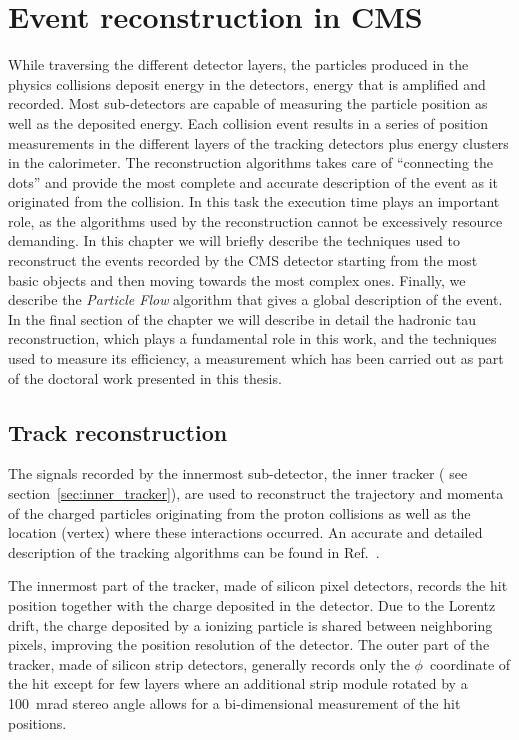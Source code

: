 \chapter{Event reconstruction in CMS}

While traversing the different detector layers, the particles produced in the physics collisions deposit energy in the detectors, energy that is amplified and recorded. Most sub-detectors are capable of measuring the particle position as well as the deposited energy. Each collision event results in a series of position measurements in the different layers of the tracking detectors plus energy clusters in the calorimeter. The reconstruction algorithms takes care of ``connecting the dots'' and provide the most complete and accurate description of the event as it originated from the collision. In this task the execution time plays an important role, as the algorithms used by the reconstruction cannot be excessively resource demanding. In this chapter we will briefly describe the techniques used to reconstruct the events recorded by the CMS detector starting from the most basic objects and then moving towards the most complex ones. Finally, we describe the \emph{Particle Flow} algorithm that gives a global description of the event. In the final section of the chapter we will describe in detail the hadronic tau reconstruction, which plays a fundamental role in this work, and the techniques used to measure its efficiency, a measurement which has been carried out as part of the doctoral work presented in this thesis.

\section{Track reconstruction}

The signals recorded by the innermost sub-detector, the inner tracker ( see section~\ref{sec:inner_tracker}), are used to reconstruct the trajectory and momenta of the charged particles originating from the proton collisions as well as the location (vertex) where these interactions occurred. An accurate and detailed description of the tracking algorithms can be found in Ref.~\cite{cms_trk_11_01}.

The innermost part of the tracker, made of silicon pixel detectors, records the hit position together with the charge deposited in the detector. Due to the Lorentz drift, the charge deposited by a ionizing particle is shared between neighboring pixels, improving the position resolution of the detector. The outer part of the tracker, made of silicon strip detectors, generally records only the $\phi$\ coordinate of the hit except for few layers where an additional strip module rotated by a 100~mrad stereo angle allows for a bi-dimensional measurement of the hit positions.

